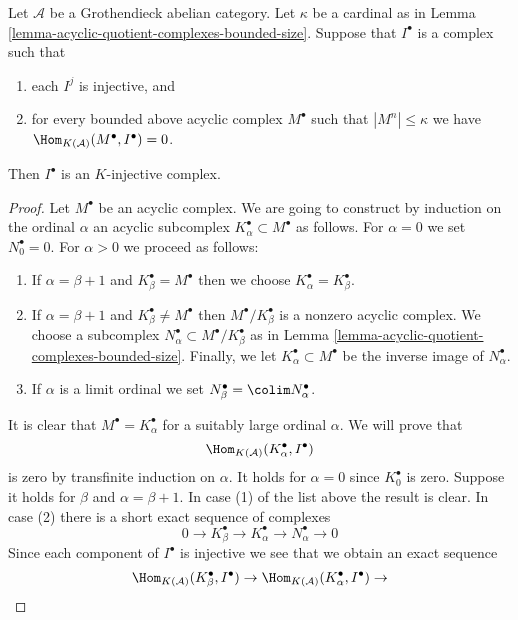 \begin{lemma}
\label{lemma-characterize-K-injective}
Let $\mathcal{A}$ be a Grothendieck abelian category.
Let $\kappa$ be a cardinal as in
Lemma \ref{lemma-acyclic-quotient-complexes-bounded-size}.
Suppose that $I^\bullet$ is a complex such that
\begin{enumerate}
\item each $I^j$ is injective, and
\item for every bounded above acyclic complex $M^\bullet$
such that $|M^n| \leq \kappa$
we have $\Hom_{K(\mathcal{A})}(M^\bullet, I^\bullet) = 0$.
\end{enumerate}
Then $I^\bullet$ is an $K$-injective complex.
\end{lemma}

\begin{proof}
Let $M^\bullet$ be an acyclic complex. We are going to construct by
induction on the ordinal $\alpha$ an acyclic subcomplex
$K_\alpha^\bullet \subset M^\bullet$ as follows.
For $\alpha = 0$ we set $N_0^\bullet = 0$. For $\alpha > 0$
we proceed as follows:
\begin{enumerate}
\item If $\alpha = \beta + 1$ and $K_\beta^\bullet = M^\bullet$
then we choose $K_\alpha^\bullet = K_\beta^\bullet$.
\item If $\alpha = \beta + 1$ and $K_\beta^\bullet \not = M^\bullet$
then $M^\bullet/K_\beta^\bullet$ is a nonzero acyclic complex.
We choose a subcomplex $N_\alpha^\bullet \subset M^\bullet/K_\beta^\bullet$
as in Lemma \ref{lemma-acyclic-quotient-complexes-bounded-size}.
Finally, we let $K_\alpha^\bullet \subset M^\bullet$
be the inverse image of $N_\alpha^\bullet$.
\item If $\alpha$ is a limit ordinal we set
$N_\beta^\bullet = \colim N_\alpha^\bullet$.
\end{enumerate}
It is clear that $M^\bullet = K_\alpha^\bullet$ for a suitably large
ordinal $\alpha$. We will prove that
$$
\Hom_{K(\mathcal{A})}(K_\alpha^\bullet, I^\bullet)
$$
is zero by transfinite induction on $\alpha$. It holds for $\alpha = 0$
since $K_0^\bullet$ is zero. Suppose it holds for $\beta$ and
$\alpha = \beta + 1$. In case (1) of the list above the result is clear.
In case (2) there is a short exact sequence of complexes
$$
0 \to K_\beta^\bullet \to K_\alpha^\bullet \to N_\alpha^\bullet \to 0
$$
Since each component of $I^\bullet$ is injective we see that we obtain
an exact sequence
$$
\Hom_{K(\mathcal{A})}(K_\beta^\bullet, I^\bullet) \to
\Hom_{K(\mathcal{A})}(K_\alpha^\bullet, I^\bullet) \to
$$
\end{proof}
